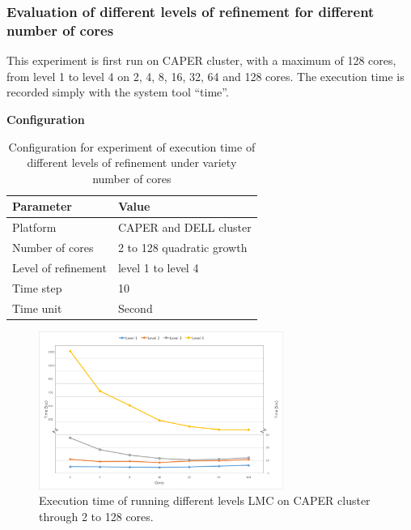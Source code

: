 \subsubsection{Evaluation of different levels of refinement for different number of cores}
This experiment is first run on CAPER cluster, with a maximum of 128 cores, from level 1 to level 4 on 2, 4, 8, 16, 32, 64 and 128 cores. The execution time is recorded simply with the system tool ``time''.

\noindent
\textbf{Configuration}
\begin{table}[H]
\begin{center}
\begin{tabular}{|l|l|}
	\hline
	\textbf{Parameter} & \textbf{Value}\\ \hline
    Platform & CAPER and DELL cluster\\ 		\hline
    Number of cores & 2 to 128 quadratic growth\\
	\hline
    Level of refinement  & level 1 to level 4\\
    \hline
    Time step & 10\\
    \hline
    Time unit & Second\\
    \hline
\end{tabular}
\end{center}
\caption{Configuration for experiment of execution time of different levels of refinement under variety number of cores
}
\label{table:table_time_refinement}
\end{table}


\noindent
\begin{figure}[H]
	\centering
    \includegraphics[width=8cm]{figs/CAPER_lev1-4_run_time_edited.jpg}
        \caption{Execution time of running different levels LMC on CAPER cluster through 2 to 128 cores. }
        \label{fig:executiontimeoncaper}
\end{figure}

